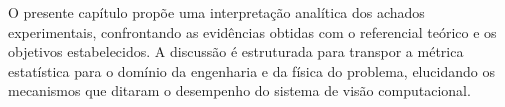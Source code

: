 O presente capítulo propõe uma interpretação analítica dos achados experimentais, confrontando as evidências obtidas com o referencial teórico e os objetivos estabelecidos. A discussão é estruturada para transpor a métrica estatística para o domínio da engenharia e da física do problema, elucidando os mecanismos que ditaram o desempenho do sistema de visão computacional.




